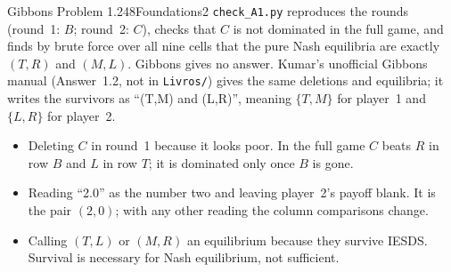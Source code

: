 \begin{exsol}{Gibbons Problem 1.2}{48}{Foundations}{2}
\verify \texttt{check\_A1.py} reproduces the rounds (round~1: $B$; round~2: $C$), checks that $C$
is not dominated in the full game, and finds by brute force over all nine cells that the pure Nash
equilibria are exactly $(T,R)$ and $(M,L)$. Gibbons gives no answer. Kumar's unofficial Gibbons
manual (Answer~1.2, not in \texttt{Livros/}) gives the same deletions and equilibria; it writes the
survivors as ``(T,M) and (L,R)'', meaning $\{T,M\}$ for player~1 and $\{L,R\}$ for player~2.

\mistakes
\begin{itemize}
  \item Deleting $C$ in round~1 because it looks poor. In the full game $C$ beats $R$ in row $B$
  and $L$ in row $T$; it is dominated only once $B$ is gone.
  \item Reading ``2.0'' as the number two and leaving player~2's payoff blank. It is the pair
  $(2,0)$; with any other reading the column comparisons change.
  \item Calling $(T,L)$ or $(M,R)$ an equilibrium because they survive IESDS. Survival is
  necessary for Nash equilibrium, not sufficient.
\end{itemize}

\end{exsol}
